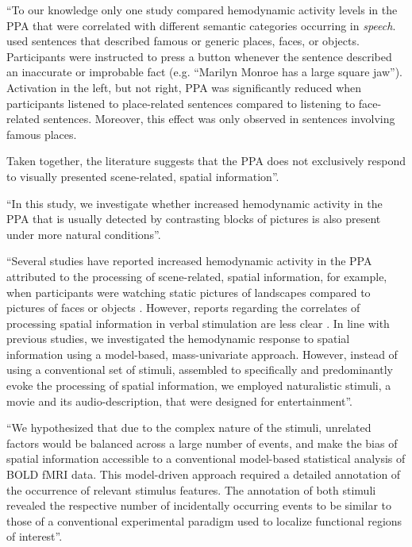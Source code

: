 ``To our knowledge only one study \citep{aziz2008modulation} compared hemodynamic
activity levels in the PPA that were correlated with different semantic
categories occurring in \textit{speech}.
\citet{aziz2008modulation} used sentences that described famous or generic
places, faces, or objects.
Participants were instructed to press a button whenever the sentence described
an inaccurate or improbable fact (e.g. ``Marilyn Monroe has a large square
jaw'').
Activation in the left, but not right, PPA was significantly reduced when
participants listened to place-related sentences compared to listening to
face-related sentences. Moreover, this effect was only observed in sentences
involving famous places.

Taken together, the literature suggests that the PPA does not exclusively
respond to visually presented scene-related, spatial information''.

``In this study, we investigate whether increased hemodynamic activity in the PPA
that is usually detected by contrasting blocks of pictures is also present under
more natural conditions''.

``Several studies have reported increased hemodynamic activity in the PPA
attributed to the processing of scene-related, spatial information, for example,
when participants were watching static pictures of landscapes compared to
pictures of faces or objects \citep{epstein1998ppa, epstein1999parahippocampal}.
However, reports regarding the correlates of processing spatial information in
verbal stimulation are less clear \citep{aziz2008modulation}.
In line with previous studies, we investigated the hemodynamic response to
spatial information using a model-based, mass-univariate approach.
However, instead of using a conventional set of stimuli, assembled to
specifically and predominantly evoke the processing of spatial information, we
employed naturalistic stimuli, a movie and its audio-description, that were
designed for entertainment''.

``We hypothesized that due to the complex nature of the stimuli, unrelated factors
would be balanced across a large number of events, and make the bias of spatial
information accessible to a conventional model-based statistical analysis of BOLD
fMRI data.
This model-driven approach required a detailed annotation of the occurrence of
relevant stimulus features.
The annotation of both stimuli revealed the respective number of incidentally
occurring events to be similar to those of a conventional experimental paradigm
used to localize functional regions of interest''.

